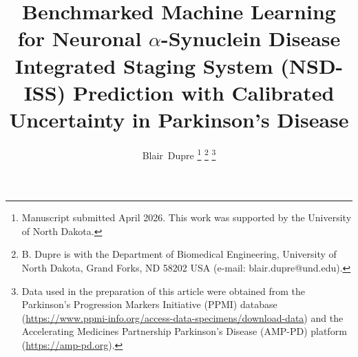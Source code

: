 \documentclass[journal]{IEEEtran}
\begin{document}
\title{Benchmarked Machine Learning for Neuronal $\alpha$-Synuclein Disease Integrated Staging System (NSD-ISS) Prediction with Calibrated Uncertainty in Parkinson's Disease}

\author{Blair~Dupre
\thanks{Manuscript submitted April 2026. This work was supported by the University of North Dakota.}
\thanks{B. Dupre is with the Department of Biomedical Engineering, University of North Dakota, Grand Forks, ND 58202 USA (e-mail: blair.dupre@und.edu).}
\thanks{Data used in the preparation of this article were obtained from the Parkinson's Progression Markers Initiative (PPMI) database (\url{https://www.ppmi-info.org/access-data-specimens/download-data}) and the Accelerating Medicines Partnership Parkinson's Disease (AMP-PD) platform (\url{https://amp-pd.org}).}
}

\maketitle




\end{document}
